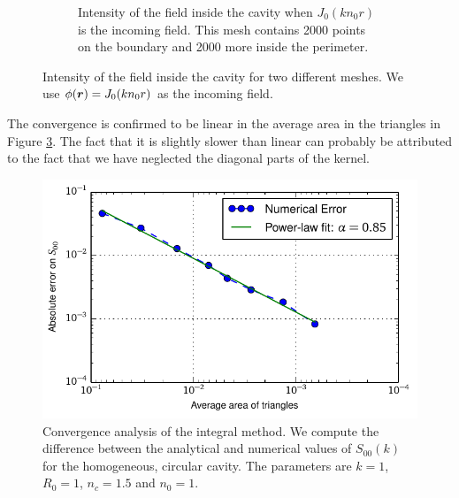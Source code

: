 \begin{figure}
\begin{subfigure}{0.47\textwidth}
		\caption[Intensity of the field inside the cavity, finer mesh]
				{Intensity of the field inside the cavity when
				$J_0(kn_0r)$ is the incoming field. This mesh contains
				2000 points on the boundary and 2000 more inside the perimeter.}
		\label{fig:app.numMethods.field.2000}
	\end{subfigure}
	\caption[Intensity of the field inside the cavity for two different meshes]
			{Intensity of the field inside the cavity for two different meshes.
			We use $\phi(\boldsymbol{r})=J_0(kn_0r)$ as the incoming field.}
	\label{fig:app.numMethods.fields}
\end{figure}

The convergence is confirmed to be linear in the average area in 
the triangles in Figure \ref{fig:app.numMethods.convergenceIntegralMethod}.
The fact that it is slightly slower than linear can probably be 
attributed to the fact that we have neglected the diagonal 
parts of the kernel. 

\begin{figure}
	\centering
	\includegraphics{figs/backmatter/convergenceAnalysis.pdf}
	\caption[Convergence analysis of the integral method]
			{Convergence analysis of the integral method. 
			We compute the difference between the analytical
			and numerical values of $S_{00}(k)$ for the homogeneous,
			circular cavity. The parameters are $k=1$, $R_0=1$, $n_c=1.5$
			and $n_0=1$.}
	\label{fig:app.numMethods.convergenceIntegralMethod}
\end{figure}

